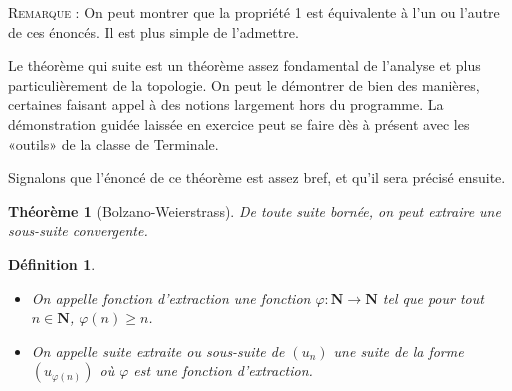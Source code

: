 \documentclass[12pt,a4paper,french]{article}
\newcommand{\N}{\mathbf{N}}
\theoremstyle{break}
\newtheorem{definition}{Définition}
\newtheorem{theoreme}{Théorème}
\theoremstyle{plain}
\theoremstyle{nonumberplain}
\theoremstyle{nonumberbreak}
\begin{document}
\textsc{Remarque :} On peut montrer que la propriété 1 est équivalente à
l'un ou l'autre de ces énoncés. Il est plus simple de l'admettre.

Le théorème qui suite est un théorème assez fondamental de l'analyse et
plus particulièrement de la topologie. On peut le démontrer de bien des
manières, certaines faisant appel à des notions largement hors du
programme. La démonstration guidée laissée en exercice peut se faire dès
à présent avec les «outils» de la classe de Terminale.

Signalons que l'énoncé de ce théorème est assez bref, et qu'il sera
précisé ensuite.

\begin{theoreme}[Bolzano-Weierstrass]
  De toute suite bornée, on peut extraire une sous-suite convergente.
\end{theoreme}

\begin{definition}
  \begin{itemize}
    \item On appelle \emph{fonction d'extraction} une fonction $\varphi
      : \N \to \N$ tel que pour tout $n \in \N$, $\varphi(n) \geqslant
      n$.
    \item On appelle \emph{suite extraite} ou \emph{sous-suite} de
      $(u_n)$ une suite de la forme $(u_{\varphi(n)})$ où $\varphi$ est
      une fonction d'extraction.
  \end{itemize}
\end{definition}
\end{document}
